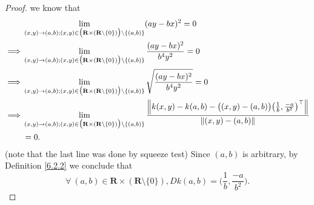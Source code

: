 \begin{proof}
    we know that
    \begin{align*}
                 & \lim_{(x, y) \to (a, b) ; (x, y) \in \big(\mathbf{R} \times (\mathbf{R} \setminus \{0\})\big) \setminus \{(a, b)\}} (ay - bx)^2 = 0                                                                                                                  \\
        \implies & \lim_{(x, y) \to (a, b) ; (x, y) \in \big(\mathbf{R} \times (\mathbf{R} \setminus \{0\})\big) \setminus \{(a, b)\}} \frac{(ay - bx)^2}{b^4 y^2} = 0                                                                                                  \\
        \implies & \lim_{(x, y) \to (a, b) ; (x, y) \in \big(\mathbf{R} \times (\mathbf{R} \setminus \{0\})\big) \setminus \{(a, b)\}} \sqrt{\frac{(ay - bx)^2}{b^4 y^2}} = 0                                                                                           \\
        \implies & \lim_{(x, y) \to (a, b) ; (x, y) \in \big(\mathbf{R} \times (\mathbf{R} \setminus \{0\})\big) \setminus \{(a, b)\}} \frac{\norm*{k(x, y) - k(a, b) - \big((x, y) - (a, b)\big) \big(\frac{1}{b}, \frac{-a}{b^2}\big)^\top}}{\norm*{(x, y) - (a, b)}} \\
                 & = 0.
    \end{align*}
    (note that the last line was done by squeeze test)
    Since \((a, b)\) is arbitrary, by Definition \ref{6.2.2} we conclude that
    \[
        \forall\ (a, b) \in \mathbf{R} \times (\mathbf{R} \setminus \{0\}), D k(a, b) = \bigg(\frac{1}{b}, \frac{-a}{b^2}\bigg).
    \]


\end{proof}
